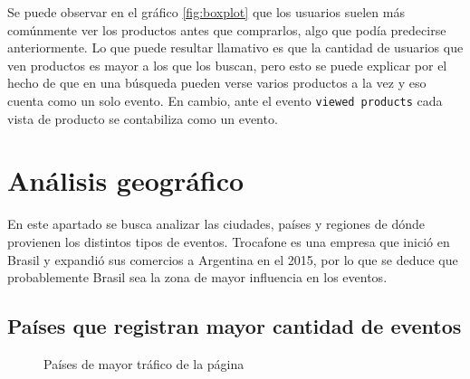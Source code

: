 \documentclass[a4paper]{article}
\begin{document}
Se puede observar en el gráfico \ref{fig:boxplot} que los usuarios suelen más comúnmente ver los productos antes que comprarlos, algo que podía predecirse anteriormente. Lo que puede resultar llamativo es que la cantidad de usuarios que ven productos es mayor a los que los buscan, pero esto se puede explicar por el hecho de que en una búsqueda pueden verse varios productos a la vez y eso cuenta como un solo evento. En cambio, ante el evento \texttt{viewed products} cada vista de producto se contabiliza como un evento.

\section{Análisis geográfico}

En este apartado se busca analizar las ciudades, países y regiones de dónde provienen los distintos tipos de eventos. Trocafone es una empresa que inició en Brasil y expandió sus comercios a Argentina en el 2015, por lo que se deduce que probablemente Brasil sea la zona de mayor influencia en los eventos.

\subsection{Países que registran mayor cantidad de eventos} 

\begin{figure}[h!]
	\caption{Países de mayor tráfico de la página}
	\label{fig:brazilrules}
\end{figure}
\end{document}
